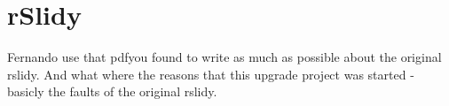 %
%
% 
% 
% 


\chapter{rSlidy}

\label{chap:rslidy}

Fernando use that pdfyou found to write as much as possible about the original rslidy. And what where the reasons that this upgrade project was started - basicly the faults of the original rslidy.